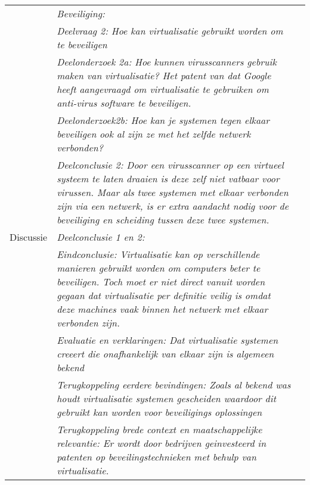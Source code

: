 \documentclass[a4paper]{article}
\begin{document}
\begin{longtable}{  p{35pt} p{300pt} p{50pt} }
		& \textit{Beveiliging:} &  \\ \cline{2-3}
		& \textit{Deelvraag 2: Hoe kan virtualisatie gebruikt worden om te beveiligen} &  \\ \cline{2-3}
		& \textit{Deelonderzoek 2a: Hoe kunnen virusscanners gebruik maken van virtualisatie?
                Het patent van dat Google heeft aangevraagd om virtualisatie
                te gebruiken om anti-virus software te beveiligen.} & \cite{wang2012securing} \\ \cline{2-3}
		& \textit{Deelonderzoek2b: Hoe kan je systemen tegen elkaar beveiligen ook al zijn ze met het zelfde netwerk verbonden?} & \cite{garber2012challenges} \\ \cline{2-3}
		& \textit{Deelconclusie 2: Door een virusscanner op een virtueel systeem te laten draaien
                                is deze zelf niet vatbaar voor virussen. Maar als twee systemen met elkaar verbonden zijn via een netwerk, is er extra
                                aandacht nodig voor de beveiliging en scheiding tussen deze twee systemen.} &  \\ \hline

   Discussie	& \textit{Deelconclusie 1 en 2:} &  \\ \cline{2-3}
		& \textit{Eindconclusie: Virtualisatie kan op verschillende manieren gebruikt worden om computers beter te beveiligen. Toch
        moet er niet direct vanuit worden gegaan dat virtualisatie per definitie veilig is omdat deze machines vaak binnen
        het netwerk met elkaar verbonden zijn.} &  \\ \cline{2-3}
		& \textit{Evaluatie en verklaringen: Dat virtualisatie systemen creeert die onafhankelijk van elkaar zijn is algemeen bekend} &  \\ \cline{2-3}
		& \textit{Terugkoppeling eerdere bevindingen: Zoals al bekend was houdt virtualisatie systemen gescheiden waardoor dit gebruikt kan worden voor beveiligings oplossingen } &  \\ \cline{2-3}
                     & \textit{Terugkoppeling brede context en maatschappelijke relevantie: Er wordt door bedrijven geinvesteerd in patenten op beveilingstechnieken met behulp van virtualisatie.} & \cite{wang2012securing} \\ \hline

\end{longtable}



\end{document}
